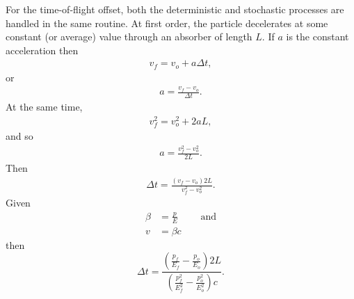 %
%
\label{sec:COSYTemporalDisplacement}\par
For the time-of-flight offset, both the deterministic and stochastic processes are handled in the same routine. At first order, the particle decelerates at some constant (or average) value through an absorber of length $L$. If $a$ is the constant acceleration then 
\begin{align*}
v_f=v_o+a\Delta t,
\end{align*}
or 
\begin{align*}
a=\frac{v_f-v_o}{\Delta t}.
\end{align*}
At the same time,
\begin{align*}
v_f ^2 = v_o ^2 + 2 a L,
\end{align*}
and so
\begin{align*}
a=\frac{v_f ^2 - v_o ^2}{2L}.
\end{align*}
Then
\begin{align*}
\Delta t = \frac{(v_f-v_o)2L}{v_f^2-v_o^2}.
\end{align*}
Given
\begin{align*}
\beta&=\frac{p}{E} \qquad \text{ and}\\
v&=\beta c
\end{align*}
then
\begin{equation}\label{eqn:cosyDeltaT}
\Delta t=\frac{(\frac{p_f}{E_f}-\frac{p_o}{E_o})2L}{(\frac{p_f ^2}{E_f ^2}-\frac{p_o ^2}{E_o ^2})c}.
\end{equation}

